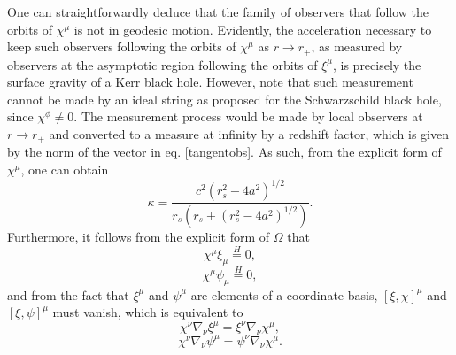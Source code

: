 \documentclass[
12pt,		%
openright,	%
twoside,  %
a4paper,			%
chapter=TITLE,		%
english,			%
french,				%
spanish,			%
brazil				%
]{USPSC-classe/USPSC}
\begin{document}
One can straightforwardly deduce that the family of observers that follow the orbits of $\chi^{\mu}$ is not in geodesic motion. Evidently, the acceleration necessary to keep such observers following the orbits of $\chi^{\mu}$ as $r\to r_+$, as measured by observers at the asymptotic region following the orbits of $\xi^{\mu}$, is precisely the surface gravity of a Kerr black hole. However, note that such measurement cannot be made by an ideal string as proposed for the Schwarzschild black hole, since $\chi^{\phi}\neq 0$. The measurement process would be made by local observers at $r\to r_+$ and converted to a measure at infinity by a redshift factor, which is given by the norm of the vector in eq. \ref{tangentobs}. As such, from the explicit form of $\chi^{\mu}$, one can obtain \cite{Chruściel2020} 
\begin{equation}\label{kappakerr}
    \kappa=\frac{c^2\left(r_s^2-4a^2\right)^{1/2}}{r_s\left(r_s+\left(r_s^2-4a^2\right)^{1/2}\right)}.
\end{equation}
Furthermore, it follows from the explicit form of $\Omega$ that
\begin{equation}\label{chixi}
    \chi^{\mu}\xi_{\mu}\overset{H}{=}0,
\end{equation}
\begin{equation}\label{chipsi}
    \chi^{\mu}\psi_{\mu}\overset{H}{=}0,
\end{equation}
and from the fact that $\xi^{\mu}$ and $\psi^{\mu}$ are elements of a coordinate basis, $[\xi,\chi]^{\mu}$ and $[\xi,\psi]^{\mu}$ must vanish, which is equivalent to
\begin{equation}\label{chixi1}
    \chi^{\nu}\nabla_{\nu}\xi^{\mu}=\xi^{\nu}\nabla_{\nu}\chi^{\mu},
\end{equation}
\begin{equation}\label{chipsi2}
    \chi^{\nu}\nabla_{\nu}\psi^{\mu}=\psi^{\nu}\nabla_{\nu}\chi^{\mu}.
\end{equation}
\end{document}
